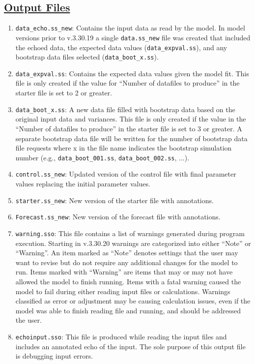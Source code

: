 \subsection[Output Files]{\protect\hyperlink{OutputFilesList}{Output Files}}
\begin{enumerate}
	\item \texttt{data\_echo.ss\_new}: Contains the input data as read by the model. In model versions prior to v.3.30.19 a single \texttt{data.ss\_new} file was created that included the echoed data, the expected data values (\texttt{data\_expval.ss}), and any bootstrap data files selected (\texttt{data\_boot\_x.ss}).
	\item \texttt{data\_expval.ss}: Contains the expected data values given the model fit. This file is only created if the value for ``Number of datafiles to produce'' in the starter file is set to 2 or greater.
	\item \texttt{data\_boot\_x.ss}: A new data file filled with bootstrap data based on the original input data and variances. This file is only created if the value in the ``Number of datafiles to produce'' in the starter file is set to 3 or greater. A separate bootstrap data file will be written for the number of bootstrap data file requests where x in the file name indicates the bootstrap simulation number (e.g., \texttt{data\_boot\_001.ss}, \texttt{data\_boot\_002.ss}, ...).
	\item \texttt{control.ss\_new}: Updated version of the control file with final parameter values replacing the initial parameter values.
	\item \texttt{starter.ss\_new}: New version of the starter file with annotations.
	\item \texttt{Forecast.ss\_new}: New version of the forecast file with annotations.
	\item \texttt{warning.sso}: This file contains a list of warnings generated during program execution. Starting in v.3.30.20 warnings are categorized into either ``Note'' or ``Warning''. An item marked as ``Note'' denotes settings that the user may want to revise but do not require any additional changes for the model to run. Items marked with ``Warning'' are items that may or may not have allowed the model to finish running. Items with a fatal warning caused the model to fail during either reading input files or calculations. Warnings classified as error or adjustment may be causing calculation issues, even if the model was able to finish reading file and running, and should be addressed the user. 
	\item \texttt{echoinput.sso}: This file is produced while reading the input files and includes an annotated echo of the input. The sole purpose of this output file is debugging input errors.

\end{enumerate}
